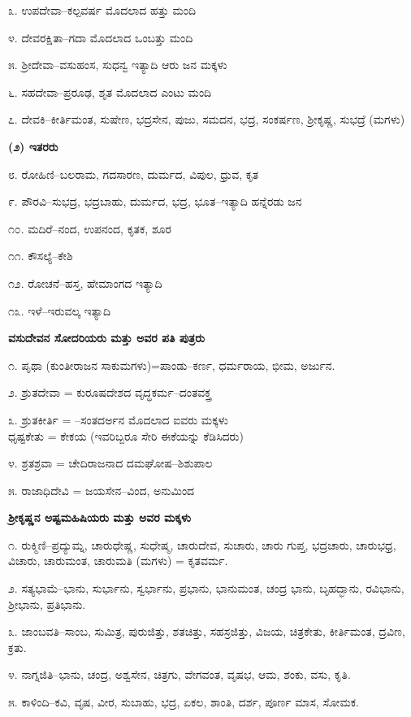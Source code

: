 ೩. ಉಪದೇವಾ–ಕಲ್ಪವರ್ಷ ಮೊದಲಾದ ಹತ್ತು ಮಂದಿ

೪. ದೇವರಕ್ಷಿತಾ–ಗದಾ ಮೊದಲಾದ ಒಂಬತ್ತು ಮಂದಿ

೫. ಶ್ರೀದೇವಾ–ವಸುಹಂಸ, ಸುಧನ್ವ ಇತ್ಯಾದಿ ಆರು ಜನ ಮಕ್ಕಳು

೬. ಸಹದೇವಾ–ಪ್ರರೂಢ, ಶೃತ ಮೊದಲಾದ ಎಂಟು ಮಂದಿ

೭. ದೇವಕಿ–ಕೀರ್ತಿಮಂತ, ಸುಷೇಣ, ಭದ್ರಸೇನ, ಪುಜು, ಸಮದನ, ಭದ್ರ, ಸಂಕರ್ಷಣ, ಶ್ರೀಕೃಷ್ಣ, ಸುಭದ್ರೆ (ಮಗಳು)

\textbf{(೨) ಇತರರು}

೮. ರೋಹಿಣಿ–ಬಲರಾಮ, ಗದಸಾರಣ, ದುರ್ಮದ, ವಿಪುಲ, ಧ್ರುವ, ಕೃತ

೯. ಪೌರವಿ–ಸುಭದ್ರ, ಭದ್ರಬಾಹು, ದುರ್ಮದ, ಭದ್ರ, ಭೂತ–ಇತ್ಯಾದಿ ಹನ್ನೆರಡು ಜನ

೧೦. ಮದಿರೆ–ನಂದ, ಉಪನಂದ, ಕೃತಕ, ಶೂರ

೧೧. ಕೌಸಲ್ಯೆ–ಕೇಶಿ

೧೨. ರೋಚನೆ–ಹಸ್ತ, ಹೇಮಾಂಗದ ಇತ್ಯಾದಿ

೧೩. ಇಳೆ–ಇರುವಲ್ಕ ಇತ್ಯಾದಿ

\begin{center}
\textbf{ವಸುದೇವನ ಸೋದರಿಯರು ಮತ್ತು ಅವರ ಪತಿ ಪುತ್ರರು}
\end{center}

೧. ಪೃಥಾ (ಕುಂತೀರಾಜನ ಸಾಕುಮಗಳು)=ಪಾಂಡು–ಕರ್ಣ, ಧರ್ಮರಾಯ, ಭೀಮ, ಅರ್ಜುನ.

೨. ಶ್ರುತದೇವಾ = ಕುರೂಷದೇಶದ ವೃದ್ಧಕರ್ಮ–ದಂತವಕ್ತ್ರ

೩. ಶ್ರುತಕೀರ್ತಿ = –ಸಂತದರ್ಅನ ಮೊದಲಾದ ಐವರು ಮಕ್ಕಳು\\ಧೃಷ್ಟಕೇತು = ಕೇಕಯ (ಇವರಿಬ್ಬರೂ ಸೇರಿ ಈಕೆಯನ್ನು ಕೆಡಿಸಿದರು)

೪. ಶ್ರತಶ್ರವಾ = ಚೇದಿರಾಜನಾದ ದಮಘೋಷ–ಶಿಶುಪಾಲ

೫. ರಾಜಾಧಿದೇವಿ = ಜಯಸೇನ–ವಿಂದ, ಅನುಮಿಂದ

\begin{center}
\textbf{ಶ್ರೀಕೃಷ್ಣನ ಅಷ್ಟಮಹಿಷಿಯರು ಮತ್ತು ಅವರ ಮಕ್ಕಳು}
\end{center}

೧. ರುಕ್ಮಿಣಿ–ಪ್ರದ್ಯುಮ್ನ, ಚಾರುಧೇಷ್ಣ, ಸುಧೇಷ್ಮ, ಚಾರುದೇವ, ಸುಚಾರು, ಚಾರು ಗುಪ್ತ, ಭದ್ರಚಾರು, ಚಾರುಭಧ್ರ, ವಿಚಾರು, ಚಾರುಮಂತ, ಚಾರುಮತಿ (ಮಗಳು) = ಕೃತವರ್ಮ.

೨. ಸತ್ಯಭಾಮೆ–ಭಾನು, ಸುರ್ಭಾನು, ಸ್ವರ್ಭಾನು, ಪ್ರಭಾನು, ಭಾನುಮಂತ, ಚಂದ್ರ ಭಾನು, ಬೃಹದ್ಭಾನು, ರವಿಭಾನು, ಶ್ರೀಭಾನು, ಪ್ರತಿಭಾನು.

೩. ಜಾಂಬವತಿ–ಸಾಂಬ, ಸುಮಿತ್ರ, ಪುರುಜಿತ್ತು, ಶತಚಿತ್ತು, ಸಹಸ್ರಜಿತ್ತು, ವಿಜಯ, ಚಿತ್ರಕೇತು, ಕೀರ್ತಿಮಂತ, ದ್ರವಿಣ, ಕ್ರತು.

೪. ನಾಗ್ನಜಿತಿ–ಭಾನು, ಚಂದ್ರ, ಅಶ್ವಸೇನ, ಚಿತ್ರಗು, ವೇಗವಂತ, ವೃಷಭ, ಆಮ, ಶಂಕು, ವಸು, ಕೃತಿ.

೫. ಕಾಳಿಂದಿ–ಕವಿ, ವೃಷ, ವೀರ, ಸುಬಾಹು, ಭದ್ರ, ಏಕಲ, ಶಾಂತಿ, ದರ್ಶ, ಪೂರ್ಣ ಮಾಸ, ಸೋಮಕ. 

